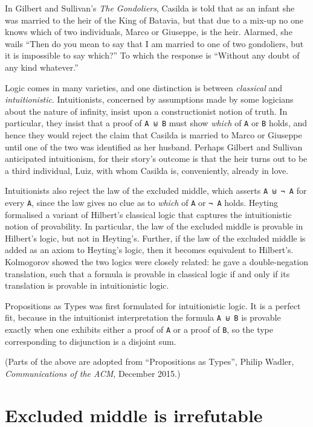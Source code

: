 In Gilbert and Sullivan's \emph{The Gondoliers}, Casilda is told that as
an infant she was married to the heir of the King of Batavia, but that
due to a mix-up no one knows which of two individuals, Marco or
Giuseppe, is the heir. Alarmed, she wails ``Then do you mean to say that
I am married to one of two gondoliers, but it is impossible to say
which?'' To which the response is ``Without any doubt of any kind
whatever.''

Logic comes in many varieties, and one distinction is between
\emph{classical} and \emph{intuitionistic}. Intuitionists, concerned by
assumptions made by some logicians about the nature of infinity, insist
upon a constructionist notion of truth. In particular, they insist that
a proof of \texttt{A\ ⊎\ B} must show \emph{which} of \texttt{A} or
\texttt{B} holds, and hence they would reject the claim that Casilda is
married to Marco or Giuseppe until one of the two was identified as her
husband. Perhaps Gilbert and Sullivan anticipated intuitionism, for
their story's outcome is that the heir turns out to be a third
individual, Luiz, with whom Casilda is, conveniently, already in love.

Intuitionists also reject the law of the excluded middle, which asserts
\texttt{A\ ⊎\ ¬\ A} for every \texttt{A}, since the law gives no clue as
to \emph{which} of \texttt{A} or \texttt{¬\ A} holds. Heyting formalised
a variant of Hilbert's classical logic that captures the intuitionistic
notion of provability. In particular, the law of the excluded middle is
provable in Hilbert's logic, but not in Heyting's. Further, if the law
of the excluded middle is added as an axiom to Heyting's logic, then it
becomes equivalent to Hilbert's. Kolmogorov showed the two logics were
closely related: he gave a double-negation translation, such that a
formula is provable in classical logic if and only if its translation is
provable in intuitionistic logic.

Propositions as Types was first formulated for intuitionistic logic. It
is a perfect fit, because in the intuitionist interpretation the formula
\texttt{A\ ⊎\ B} is provable exactly when one exhibits either a proof of
\texttt{A} or a proof of \texttt{B}, so the type corresponding to
disjunction is a disjoint sum.

(Parts of the above are adopted from ``Propositions as Types'', Philip
Wadler, \emph{Communications of the ACM}, December 2015.)

\hypertarget{excluded-middle-is-irrefutable}{%
\section{Excluded middle is
irrefutable}\label{excluded-middle-is-irrefutable}}

